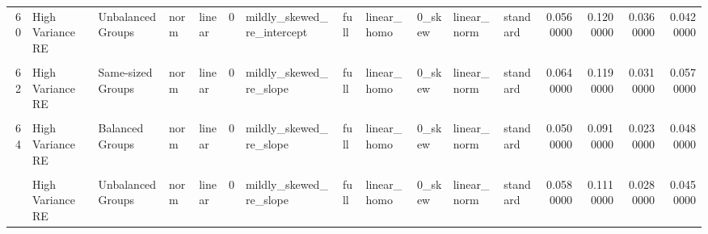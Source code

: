 \documentclass[12pt]{article}
\begin{document}
\begin{table}
{\begin{tabular}[t]{rllllrllllllrrrr}
60 & High Variance RE & Unbalanced Groups & norm & linear & 0 & mildly\_skewed\_re\_intercept & full & linear\_homo & 0\_skew & linear\_norm & standard & 0.0560000 & 0.1200000 & 0.0360000 & 0.0420000\\
\addlinespace
\cellcolor{gray!6}{61} & \cellcolor{gray!6}{High Variance Error} & \cellcolor{gray!6}{Same-sized Groups} & \cellcolor{gray!6}{norm} & \cellcolor{gray!6}{linear} & \cellcolor{gray!6}{0} & \cellcolor{gray!6}{mildly\_skewed\_re\_slope} & \cellcolor{gray!6}{full} & \cellcolor{gray!6}{linear\_homo} & \cellcolor{gray!6}{0\_skew} & \cellcolor{gray!6}{linear\_norm} & \cellcolor{gray!6}{standard} & \cellcolor{gray!6}{0.0590000} & \cellcolor{gray!6}{0.0950000} & \cellcolor{gray!6}{0.1080000} & \cellcolor{gray!6}{0.0630000}\\
62 & High Variance RE & Same-sized Groups & norm & linear & 0 & mildly\_skewed\_re\_slope & full & linear\_homo & 0\_skew & linear\_norm & standard & 0.0640000 & 0.1190000 & 0.0310000 & 0.0570000\\
\cellcolor{gray!6}{63} & \cellcolor{gray!6}{High Variance Error} & \cellcolor{gray!6}{Balanced Groups} & \cellcolor{gray!6}{norm} & \cellcolor{gray!6}{linear} & \cellcolor{gray!6}{0} & \cellcolor{gray!6}{mildly\_skewed\_re\_slope} & \cellcolor{gray!6}{full} & \cellcolor{gray!6}{linear\_homo} & \cellcolor{gray!6}{0\_skew} & \cellcolor{gray!6}{linear\_norm} & \cellcolor{gray!6}{standard} & \cellcolor{gray!6}{0.0470000} & \cellcolor{gray!6}{0.1130000} & \cellcolor{gray!6}{0.0980000} & \cellcolor{gray!6}{0.0400000}\\
64 & High Variance RE & Balanced Groups & norm & linear & 0 & mildly\_skewed\_re\_slope & full & linear\_homo & 0\_skew & linear\_norm & standard & 0.0500000 & 0.0910000 & 0.0230000 & 0.0480000\\
\cellcolor{gray!6}{65} & \cellcolor{gray!6}{High Variance Error} & \cellcolor{gray!6}{Unbalanced Groups} & \cellcolor{gray!6}{norm} & \cellcolor{gray!6}{linear} & \cellcolor{gray!6}{0} & \cellcolor{gray!6}{mildly\_skewed\_re\_slope} & \cellcolor{gray!6}{full} & \cellcolor{gray!6}{linear\_homo} & \cellcolor{gray!6}{0\_skew} & \cellcolor{gray!6}{linear\_norm} & \cellcolor{gray!6}{standard} & \cellcolor{gray!6}{0.0460000} & \cellcolor{gray!6}{0.1030000} & \cellcolor{gray!6}{0.0870000} & \cellcolor{gray!6}{0.0520000}\\
\addlinespace
66 & High Variance RE & Unbalanced Groups & norm & linear & 0 & mildly\_skewed\_re\_slope & full & linear\_homo & 0\_skew & linear\_norm & standard & 0.0580000 & 0.1110000 & 0.0280000 & 0.0450000\\

\end{tabular}}
\end{table}
\end{document}
